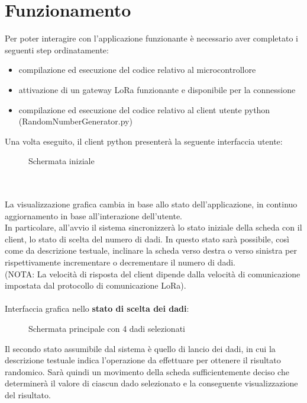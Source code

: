 \section{Funzionamento}
Per poter interagire con l'applicazione funzionante è necessario aver completato i seguenti step ordinatamente:
\begin{itemize}
    \item compilazione ed esecuzione del codice relativo al microcontrollore
    \item attivazione di un gateway LoRa funzionante e disponibile per la connessione
    \item compilazione ed esecuzione del codice relativo al client utente python (RandomNumberGenerator.py)
\end{itemize}
Una volta eseguito, il client python presenterà la seguente interfaccia utente:
\begin{figure}[h!]
    \centering
    \caption{Schermata iniziale}
    \label{fig:homepage}
\end{figure}
\\\\La visualizzazione grafica cambia in base allo stato dell'applicazione, in continuo aggiornamento in base all'interazione dell'utente.
\\In particolare, all'avvio il sistema sincronizzerà lo stato iniziale della scheda con il client, lo stato di scelta del numero di dadi.
In questo stato sarà possibile, così come da descrizione testuale, inclinare la scheda verso destra o verso sinistra per rispettivamente
incrementare o decrementare il numero di dadi. 
\\(NOTA: La velocità di risposta del client dipende dalla velocità di comunicazione 
impostata dal protocollo di comunicazione LoRa).
\\\\Interfaccia grafica nello \textbf{stato di scelta dei dadi}:
\begin{figure}[H]
    \centering
    \caption{Schermata principale con 4 dadi selezionati}
    \label{fig:RollStateOFF}
\end{figure}
Il secondo stato assumibile dal sistema è quello di lancio dei dadi, in cui la descrizione testuale indica l'operazione da effettuare per 
ottenere il risultato randomico. Sarà quindi un movimento della scheda sufficientemente deciso che determinerà il valore di ciascun dado selezionato
e la conseguente visualizzazione del risultato.
